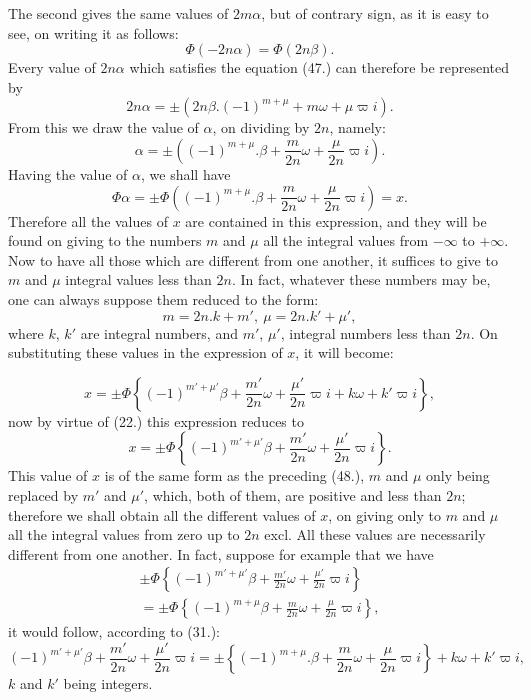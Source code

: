 \documentclass{article}
\begin{document}
The second gives the same values of $2m\alpha$, but of contrary sign, as it is easy to see, on writing it as follows:
\[ \Phi(-2n\alpha)=\Phi(2n\beta). \]
Every value of $2n\alpha$ which satisfies the equation (47.) can therefore be represented by
\[ 2n\alpha=\pm(2n\beta.(-1)^{m+\mu}+m\omega+\mu\varpi i). \]
From this we draw the value of $\alpha$, on dividing by $2n$, namely:
\[ \alpha=\pm\left((-1)^{m+\mu}.\beta+\frac{m}{2n}\omega+\frac{\mu}{2n}\varpi i\right). \]
Having the value of $\alpha$, we shall have
\[ \Phi\alpha=\pm\Phi\left((-1)^{m+\mu}.\beta+\frac{m}{2n}\omega+\frac{\mu}{2n}\varpi i\right)=x. \tag{48.} \]
Therefore all the values of $x$ are contained in this expression, and they will be found on giving to the numbers $m$ and $\mu$ all the integral values from $-\infty$ to $+\infty$. Now to have all those which are different from one another, it suffices to give to $m$ and $\mu$ integral values less than $2n$. In fact, whatever these numbers may be, one can always suppose them reduced to the form:
\[ m=2n.k+m',\ \mu=2n.k'+\mu', \]
where $k$, $k'$ are integral numbers, and $m'$, $\mu'$, integral numbers less than $2n$. On substituting these values in the expression of $x$, it will become:

\[ x=\pm\Phi\left\{(-1)^{m'+\mu'}\beta+\frac{m'}{2n}\omega+\frac{\mu'}{2n}\varpi i+k\omega+k'\varpi i\right\}, \]
now by virtue of (22.) this expression reduces to
\[ x=\pm\Phi\left\{(-1)^{m'+\mu'}\beta+\frac{m'}{2n}\omega+\frac{\mu'}{2n}\varpi i\right\}. \tag{49.} \]
This value of $x$ is of the same form as the preceding (48.), $m$ and $\mu$ only being replaced by $m'$ and $\mu'$, which, both of them, are positive and less than $2n$; therefore we shall obtain all the different values of $x$, on giving only to $m$ and $\mu$ all the integral values from zero up to $2n$ excl. All these values are necessarily different from one another. In fact, suppose for example that we have
\[ \begin{gathered} \pm\Phi\left\{(-1)^{m'+\mu'}\beta+\frac{m'}{2n}\omega+\frac{\mu'}{2n}\varpi i\right\}\\ =\pm\Phi\left\{(-1)^{m+\mu}\beta+\frac{m}{2n}\omega+\frac{\mu}{2n}\varpi i\right\}, \end{gathered} \]
it would follow, according to (31.):
\[ (-1)^{m'+\mu'}\beta+\frac{m'}{2n}\omega+\frac{\mu'}{2n}\varpi i=\pm\left\{(-1)^{m+\mu}.\beta+\frac{m}{2n}\omega+\frac{\mu}{2n}\varpi i\right\}+k\omega+k'\varpi i, \]
$k$ and $k'$ being integers.
\end{document}
